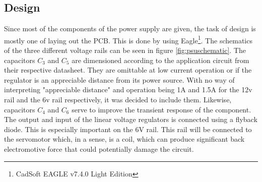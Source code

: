 \subsection{Design}
Since most of the components of the power supply are given, the task of design is mostly one of laying out the PCB. This is done by using Eagle\footnote{CadSoft EAGLE v7.4.0 Light Edition}. The schematics of the three different voltage rails can be seen in figure \ref{fig:psuschematic}.
The capacitors $C_3$ and $C_5$ are dimensioned according to the application circuit from their respective datasheet. They are omittable at low current operation or if the regulator is an appreciable distance from its power source. With no way of interpreting "appreciable distance" and operation being 1A and 1.5A for the 12v rail and the 6v rail respectively, it was decided to include them. Likewise, capacitors $C_4$ and $C_6$ serve to improve the transient response of the component.
The output and input of the linear voltage regulators is connected using a flyback diode. This is especially important on the 6V rail. This rail will be connected to the servomotor which, in a sense, is a coil, which can produce significant back electromotive force that could potentially damage the circuit.
